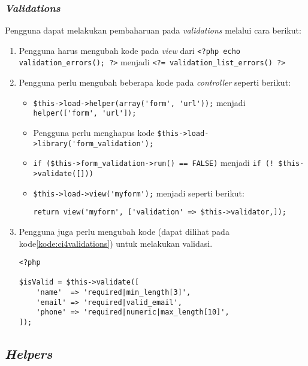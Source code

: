 \subsubsection{\textit{Validations}}
Pengguna dapat melakukan pembaharuan pada \textit{validations} melalui cara berikut:
\begin{enumerate}
\item Pengguna harus mengubah kode pada \textit{view} dari \verb|<?php echo validation_errors(); ?>| menjadi \verb|<?= validation_list_errors() ?>|
\item Pengguna perlu mengubah beberapa kode pada \textit{controller} seperti berikut:
	\begin{itemize}
		\item \verb|$this->load->helper(array('form', 'url'));| menjadi \verb|helper(['form', 'url']);|
		\item Pengguna perlu menghapus kode \verb|$this->load->library('form_validation');|
		\item \verb|if ($this->form_validation->run() == FALSE)| menjadi \verb|if (! $this->validate([]))|
		\item \verb|$this->load->view('myform');| menjadi seperti berikut:
\begin{center}		
 \verb|return view('myform', ['validation' => $this->validator,]);|
\end{center}
	\end{itemize}
	\item Pengguna juga perlu mengubah kode (dapat dilihat pada kode\ref{kode:ci4validations}) untuk melakukan validasi.
	\begin{lstlisting}[caption=Perubahan kode untuk melakukan validasi. ,label=kode:ci4validations]
<?php

$isValid = $this->validate([
    'name'  => 'required|min_length[3]',
    'email' => 'required|valid_email',
    'phone' => 'required|numeric|max_length[10]',
]);
\end{lstlisting}
\end{enumerate}

\iffalse
\subsubsection{\textit{Zip Encoding}}
\textit{Library} ini sudah tidak tersedia pada \textit{CodeIgniter 4} dan akan digantikan dengan 
\fi

\subsection{\textit{Helpers}}
 
